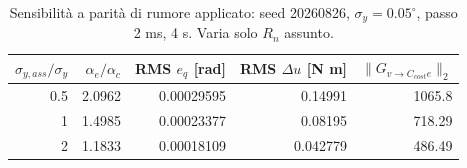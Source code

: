 \begin{table}[H]\centering\small
\begin{tabular}{rrrrr}\toprule
$\sigma_{y,ass}/\sigma_y$ & $\alpha_e/\alpha_c$ & RMS $e_q$ [rad] & RMS $\Delta u$ [N m] & $\|G_{v\to C_{cost}e}\|_2$ \\
\midrule
0.5 & 2.0962 & 0.00029595 & 0.14991 & 1065.8 \\
1 & 1.4985 & 0.00023377 & 0.08195 & 718.29 \\
2 & 1.1833 & 0.00018109 & 0.042779 & 486.49 \\
\bottomrule\end{tabular}
\caption{Sensibilit\`a a parit\`a di rumore applicato: seed 20260826, $\sigma_y=0.05^\circ$, passo 2 ms, 4 s. Varia solo $R_n$ assunto.}\label{tab:kalman-fixed}
\end{table}
